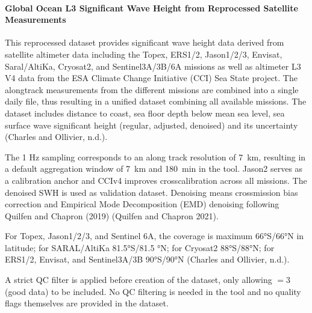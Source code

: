 \documentclass[a4paper,10pt,english]{sphinxmanual}
\begin{document}
\paragraph{Global Ocean L3 Significant Wave Height from Reprocessed Satellite Measurements}
\label{\detokenize{05_reference_datasets:global-ocean-l3-significant-wave-height-from-reprocessed-satellite-measurements}}
\sphinxAtStartPar
{}

\sphinxAtStartPar
This reprocessed dataset provides significant wave height data derived from satellite altimeter data including the Topex, ERS\sphinxhyphen{}1/2, Jason\sphinxhyphen{}1/2/3, Envisat, Saral/AltiKa, Cryosat\sphinxhyphen{}2, and Sentinel\sphinxhyphen{}3A/3B/6A missions as well as altimeter L3 V4 data from the ESA Climate Change Initiative (CCI) Sea State project. The along\sphinxhyphen{}track measurements from the different missions are combined into a single daily file, thus resulting in a unified dataset combining all available missions. The dataset includes distance to coast, sea floor depth below mean sea level, sea surface wave significant height (regular, adjusted, denoised) and its uncertainty (Charles and Ollivier, n.d.).

\sphinxAtStartPar
{}

\sphinxAtStartPar
The 1 Hz sampling corresponds to an along track resolution of 7 km, resulting in a default aggregation window of 7 km and 180 min in the  tool. Jason\sphinxhyphen{}2 serves as a calibration anchor and CCIv4 improves cross\sphinxhyphen{}calibration across all missions. The denoised SWH is used as validation dataset. Denoising means cross\sphinxhyphen{}mission bias correction and Empirical Mode Decomposition (EMD) denoising following Quilfen and Chapron (2019) (Quilfen and Chapron 2021).

\sphinxAtStartPar
For Topex, Jason\sphinxhyphen{}1/2/3, and Sentinel 6\sphinxhyphen{}A, the coverage is maximum 66°S/66°N in latitude; for SARAL/AltiKa 81.5°S/81.5 °N; for Cryosat\sphinxhyphen{}2 88°S/88°N; for ERS\sphinxhyphen{}1/2, Envisat, and Sentinel\sphinxhyphen{}3A/3B 90°S/90°N (Charles and Ollivier, n.d.).

\sphinxAtStartPar
{}

\sphinxAtStartPar
A strict QC filter is applied before creation of the dataset, only allowing  \(= 3\) (good data) to be included. No QC filtering is needed in the  tool and no quality flags themselves are provided in the dataset.
\end{document}

